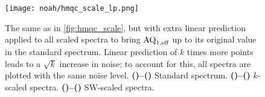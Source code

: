 \begin{figure}[!htbp]
    \centering
    \texttt{[image: noah/hmqc\_scale\_lp.png]}%
    {\label{fig:hmqc_scale_lp_std2}}%
    {\label{fig:hmqc_scale_lp_std1}}%
    {\label{fig:hmqc_scale_lp_k22}}%
    {\label{fig:hmqc_scale_lp_k21}}%
    {\label{fig:hmqc_scale_lp_k42}}%
    {\label{fig:hmqc_scale_lp_k41}}%
    {\label{fig:hmqc_scale_lp_k82}}%
    {\label{fig:hmqc_scale_lp_k81}}%
    {\label{fig:hmqc_scale_lp_sw22}}%
    {\label{fig:hmqc_scale_lp_sw21}}%
    {\label{fig:hmqc_scale_lp_sw42}}%
    {\label{fig:hmqc_scale_lp_sw41}}%
    {\label{fig:hmqc_scale_lp_sw82}}%
    {\label{fig:hmqc_scale_lp_sw81}}%
    \caption[Effects of $k$- and SW-scaling on NOAH HMQC spectrum with extra linear prediction]{
        The same as in \cref{fig:hmqc_scale}, but with extra linear prediction applied to all scaled spectra to bring $\text{AQ}_{1,\text{eff}}$ up to its original value in the standard spectrum.
        Linear prediction of $k$ times more points leads to a $\sqrt{k}$ increase in noise; to account for this, all spectra are plotted with the same noise level.
        \textbf{()--()} Standard spectrum.
        \textbf{()--()} $k$-scaled spectra.
        \textbf{()--()} SW-scaled spectra.
    }
    \label{fig:hmqc_scale_lp}
\end{figure}

